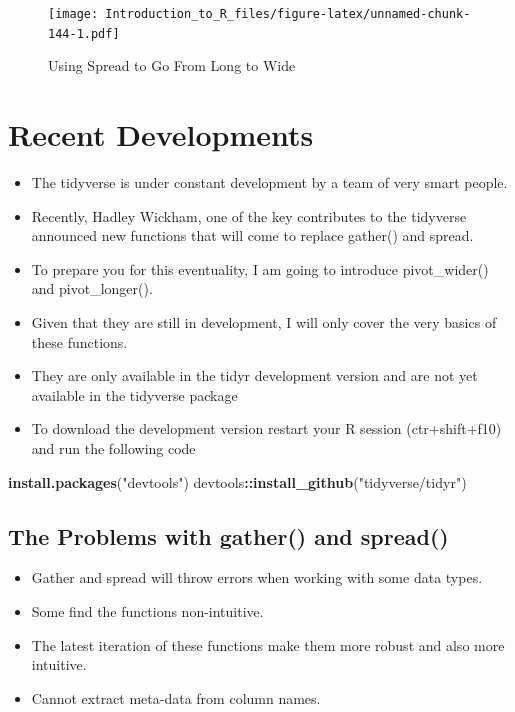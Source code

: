 \documentclass[]{book}
\newenvironment{Shaded}{\begin{snugshade}}{\end{snugshade}}
\newcommand{\KeywordTok}[1]{\textcolor[rgb]{0.13,0.29,0.53}{\textbf{#1}}}
\newcommand{\NormalTok}[1]{#1}
\newcommand{\OperatorTok}[1]{\textcolor[rgb]{0.81,0.36,0.00}{\textbf{#1}}}
\newcommand{\StringTok}[1]{\textcolor[rgb]{0.31,0.60,0.02}{#1}}
\providecommand{\tightlist}{%
  \setlength{\itemsep}{0pt}\setlength{\parskip}{0pt}}
\theoremstyle{definition}
\theoremstyle{definition}
\theoremstyle{definition}
\theoremstyle{remark}
\begin{document}
\begin{figure}
\centering
\texttt{[image: Introduction\_to\_R\_files/figure-latex/unnamed-chunk-144-1.pdf]}
\caption{\label{fig:unnamed-chunk-144}Using Spread to Go From Long to Wide}
\end{figure}

\hypertarget{recent-developments}{%
\section{Recent Developments}\label{recent-developments}}

\begin{itemize}
\tightlist
\item
  The tidyverse is under constant development by a team of very smart people.
\item
  Recently, Hadley Wickham, one of the key contributes to the tidyverse announced new functions that will come to replace gather() and spread.
\item
  To prepare you for this eventuality, I am going to introduce pivot\_wider() and pivot\_longer().
\item
  Given that they are still in development, I will only cover the very basics of these functions.
\item
  They are only available in the tidyr development version and are not yet available in the tidyverse package
\item
  To download the development version restart your R session (ctr+shift+f10) and run the following code
\end{itemize}

\begin{Shaded}
\begin{Highlighting}[]
\KeywordTok{install.packages}\NormalTok{(}\StringTok{"devtools"}\NormalTok{)}
\NormalTok{devtools}\OperatorTok{::}\KeywordTok{install_github}\NormalTok{(}\StringTok{"tidyverse/tidyr"}\NormalTok{)}
\end{Highlighting}
\end{Shaded}

\hypertarget{the-problems-with-gather-and-spread}{%
\subsection{The Problems with gather() and spread()}\label{the-problems-with-gather-and-spread}}

\begin{itemize}
\tightlist
\item
  Gather and spread will throw errors when working with some data types.
\item
  Some find the functions non-intuitive.
\item
  The latest iteration of these functions make them more robust and also more intuitive.
\item
  Cannot extract meta-data from column names.
\end{itemize}
\end{document}
